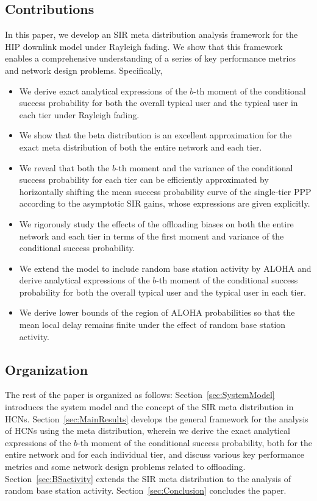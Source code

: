 \documentclass[12pt,draftclsnofoot,journal,onecolumn]{IEEEtran}
\begin{document}
\subsection{Contributions}
In this paper, we develop an SIR meta distribution analysis framework for the HIP downlink model under Rayleigh fading. We show that this framework enables a comprehensive understanding of a series of key performance metrics and network design problems. Specifically, 
\begin{itemize}
	\item We derive exact analytical expressions of the $b$-th moment of the conditional success probability for both the overall typical user and the typical user in each tier under Rayleigh fading. 
	\item We show that the beta distribution is an excellent approximation for the exact meta distribution of both the entire network and each tier.
	\item We reveal that both the $b$-th moment and the variance of the conditional success probability for each tier can be efficiently approximated by horizontally shifting the mean success probability curve of the single-tier PPP according to the asymptotic SIR gains, whose expressions are given explicitly.  
	\item We rigorously study the effects of the offloading biases on both the entire network and each tier in terms of the first moment and variance of the conditional success probability. 
	\item We extend the model to include random base station activity by ALOHA and derive analytical expressions of the $b$-th moment of the conditional success probability for both the overall typical user and the typical user in each tier.
	\item We derive lower bounds of the region of ALOHA probabilities so that the mean local delay remains finite under the effect of random base station activity.   
\end{itemize} 

\subsection{Organization}
The rest of the paper is organized as follows: Section~\ref{sec:SystemModel} introduces the system model and the concept of the SIR meta distribution in HCNs. Section~\ref{sec:MainResults} develops the general framework for the analysis of HCNs using the meta distribution, wherein we derive the exact analytical expressions of the $b$-th moment of the conditional success probability, both for the entire network and for each individual tier, and discuss various key performance metrics and some network design problems related to offloading. Section~\ref{sec:BSactivity} extends the SIR meta distribution to the analysis of random base station activity. Section~\ref{sec:Conclusion} concludes the paper.
 
\end{document}
